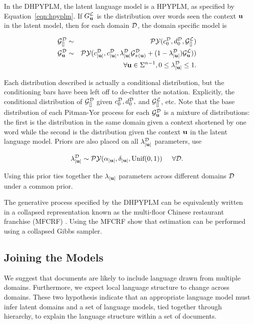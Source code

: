 In the DHPYPLM, the latent language model is a HPYPLM, as specified by Equation~\ref{eqn:hpyplm}.  If $G^\LA_\bu$ is the distribution over words seen the context $\bu$ in the latent model, then for each domain $\D$,  the domain specific model is

\begin{eqnarray}
\G^\D_{[]} &\sim& \PY(c^\D_0, d^\D_0,\G^\LA_{[]}) \nonumber \\
\G^\D_\bu &\sim& \PY(c^\D_{|\bu|}, c^\D_{|\bu|}, \lambda^\D_{|\bu|}\G^\D_{\pi(\bu)} + (1-\lambda^\D_{|\bu|})\G^\LA_\bu)) \nonumber \\ 
&& \hspace{2cm} \forall \bu \in \Sigma^{n-1}, 0 \leq \lambda^\D_{|\bu|} \leq 1. \nonumber
\end{eqnarray}

Each distribution described is actually a conditional distribution, but the conditioning bars have been left off to de-clutter the notation.  Explicitly, the conditional distribution of $\G^\D_{[]}$ given $c^\D_0, d^\D_0,$ and $\G^\LA_{[]}$, etc.  Note that the base distribution of each Pitman-Yor process for each $\G^\D_\bu$ is a mixture of distributions: the first is the distribution in the same domain given a context shortened by one word while the second is the distribution given the context $\bu$ in the latent language model. Priors are also placed on all $\lambda^\D_{|\bu|}$ parameters, \cite{wood and teh} use

$$\lambda^\D_{|\bu|} \sim \PY(\alpha_{|\bu|}, \delta_{|\bu|}, \textrm{Unif}(0,1))  \hspace{.5cm} \forall \D.$$

Using this prior ties together the $\lambda_{|\bu|}$ parameters across different domains $\D$ under a common prior.

The generative process specified by the  DHPYPLM can be equivalently written in a collapsed representation known as the multi-floor Chinese restaurant franchise (MFCRF) \cite{wood and teh}.  Using the MFCRF \cite{wood and teh} show that estimation can be performed using a collapsed Gibbs sampler.

\subsection{Joining the Models}

We suggest that documents are likely to include language drawn from multiple domains.   Furthermore, we expect local language structure to change across domains. These two hypothesis indicate that an appropriate language model must infer latent domains and a set of language models, tied together through hierarchy, to explain the language structure within a set of documents.


